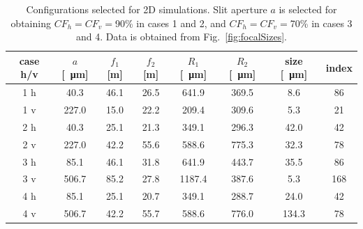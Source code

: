 \documentclass{iucr}              %
\begin{document}
\begin{table}[]
    \label{table:2Dusercases}
    \caption{Configurations selected for 2D simulations. Slit aperture $a$ is selected for obtaining $CF_h=CF_v=$90\% in cases 1 and 2, and $CF_h=CF_v=$70\% in cases 3 and 4. Data is obtained from Fig.~\ref{fig:focalSizes}.
    }
    \centering
    \begin{tabular}{c|c|c|c|c|c|c|c}
         case h/v & $a$ [\SI{}{\micro\meter}] & $f_1$ [m] & $f_2$ [m] & $R_1$ [\SI{}{\micro\meter}]& $R_2$ [\SI{}{\micro\meter}] & size [\SI{}{\micro\meter}]& index\\
         \hline
1 h &      40.3 & 46.1 &     26.5 &     641.9 &     369.5 &     8.6 &     86 \\
1 v &      227.0 & 15.0 &     22.2 &     209.4 &     309.6 &     5.3 &     21 \\
\hline
2 h &      40.3 & 25.1 &     21.3 &     349.1 &     296.3 &     42.0 &     42 \\
2 v &      227.0 & 42.2 &     55.6 &     588.6 &     775.3 &     32.3 &     78 \\
\hline \hline
3 h &      85.1 & 46.1 &     31.8 &     641.9 &     443.7 &     35.5 &     86 \\
3 v &      506.7 & 85.2 &     27.8 &     1187.4 &     387.6  &     5.3 &     168 \\
\hline
4 h &      85.1 & 25.1 &     20.7 &     349.1 &     288.7 &     24.0 &     42 \\
4 v &      506.7 & 42.2 &     55.7 &     588.6 &     776.0 &     134.3 &     78 \\

    \end{tabular}
\end{table}
\end{document}

